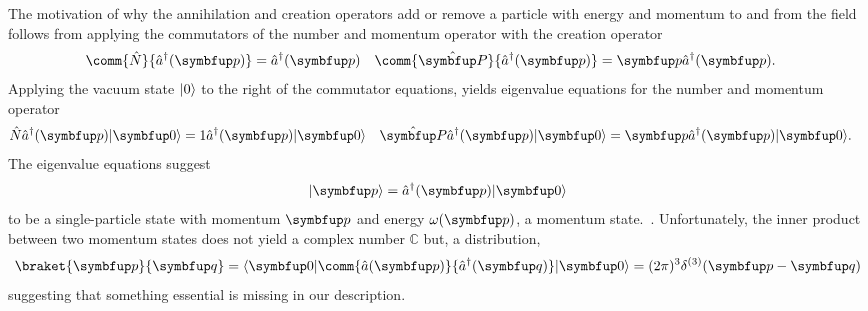 The motivation of why the annihilation and creation operators add or remove a particle with energy and momentum to and from the field follows from applying the commutators of the number and momentum operator with the creation operator
\begin{align}
	\comm{\hat{N}}{\hat{a}^\dagger(\vb{p})}
	&=
	\hat{a}^\dagger(\vb{p})
	&
	\comm{\vu{P}}{\hat{a}^\dagger(\vb{p})}
	&=
	\vb{p}
	\hat{a}^\dagger(\vb{p})
	.
\end{align}
Applying the vacuum state $\lvert0\rangle$ to the right of the commutator equations, yields eigenvalue equations for the number and momentum operator
\begin{align}
	\hat{N}
	\hat{a}^\dagger(\vb{p})
	\vacket
	&=
	1
	\hat{a}^\dagger(\vb{p})
	\vacket
	&
	\vu{P}
	\hat{a}^\dagger(\vb{p})
	\vacket
	&=
	\vb{p}
	\hat{a}^\dagger(\vb{p})
	\vacket
	.
\end{align}
The eigenvalue equations suggest
\begin{equation}
	\ket{\vb{p}}
	=
	\hat{a}^\dagger(\vb{p})
	\vacket
	\label{eq:momentum_state}
\end{equation}
to be a single-particle state with momentum $\vb{p}$ and energy $\omega(\vb{p})$, a momentum state.~\cite[p.~23]{Peskin1995}.
Unfortunately, the inner product between two momentum states does not yield a complex number $\mathbb{C}$ but, a distribution,
\begin{equation}
	\braket{\vb{p}}{\vb{q}}
	=
	\vacbra
	\comm{\hat{a}(\vb{p})}{\hat{a}^\dagger(\vb{q})}
	\vacket
	=
	(2\pi)^3
	\delta^{(3)}(\vb{p}-\vb{q})
\end{equation}
suggesting that something essential is missing in our description.

